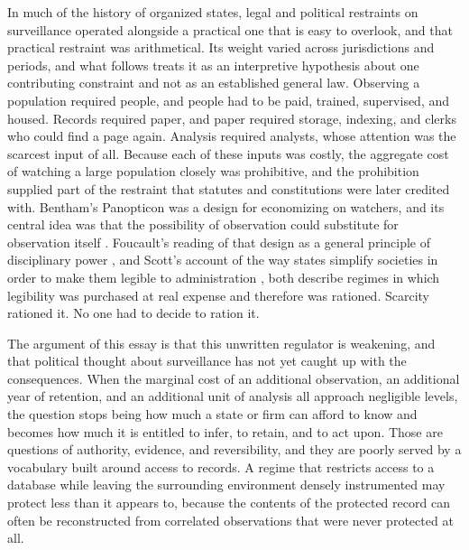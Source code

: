 \documentclass[11pt]{article}
\theoremstyle{plain}
\theoremstyle{definition}
\theoremstyle{remark}
\begin{document}
In much of the history of organized states, legal and political restraints on surveillance operated alongside a practical one that is easy to overlook, and that practical restraint was arithmetical. Its weight varied across jurisdictions and periods, and what follows treats it as an interpretive hypothesis about one contributing constraint and not as an established general law. Observing a population required people, and people had to be paid, trained, supervised, and housed. Records required paper, and paper required storage, indexing, and clerks who could find a page again. Analysis required analysts, whose attention was the scarcest input of all. Because each of these inputs was costly, the aggregate cost of watching a large population closely was prohibitive, and the prohibition supplied part of the restraint that statutes and constitutions were later credited with. Bentham's Panopticon was a design for economizing on watchers, and its central idea was that the possibility of observation could substitute for observation itself \cite{bentham1791}. Foucault's reading of that design as a general principle of disciplinary power \cite{foucault1975}, and Scott's account of the way states simplify societies in order to make them legible to administration \cite{scott1998}, both describe regimes in which legibility was purchased at real expense and therefore was rationed. Scarcity rationed it. No one had to decide to ration it.

The argument of this essay is that this unwritten regulator is weakening, and that political thought about surveillance has not yet caught up with the consequences. When the marginal cost of an additional observation, an additional year of retention, and an additional unit of analysis all approach negligible levels, the question stops being how much a state or firm can afford to know and becomes how much it is entitled to infer, to retain, and to act upon. Those are questions of authority, evidence, and reversibility, and they are poorly served by a vocabulary built around access to records. A regime that restricts access to a database while leaving the surrounding environment densely instrumented may protect less than it appears to, because the contents of the protected record can often be reconstructed from correlated observations that were never protected at all.
\end{document}
